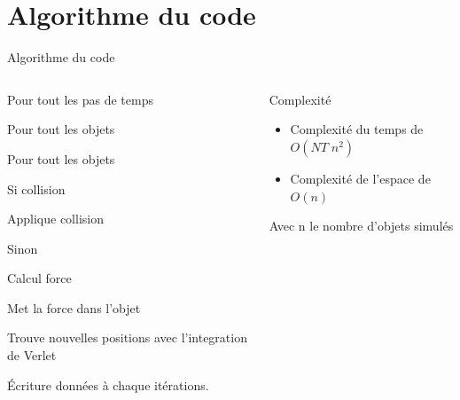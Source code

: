 \documentclass[aspectratio=169,xcolor=dvipsnames]{beamer}
\begin{document}
\section{Algorithme du code}
\begin{frame}{Algorithme du code}
    \begin{columns}
        \begin{column}[]{0.7\textwidth}
            \begin{itemize}
                \item[] Pour tout les pas de temps 
                {\setlength\itemindent{15pt} \item[] Pour tout les objets}
                {\setlength\itemindent{30pt} \item[] Pour tout les objets }
                {\setlength\itemindent{45pt} \item[] Si collision }
                {\setlength\itemindent{60pt} \item[] Applique collision}
                {\setlength\itemindent{45pt} \item[] Sinon}
                {\setlength\itemindent{60pt} \item[] Calcul force}
                {\setlength\itemindent{15pt} \item[] Met la force dans l'objet}
                \item[] Trouve nouvelles positions avec l'integration de Verlet 
                \item[] Écriture données à chaque itérations.
            \end{itemize}
        \end{column}
        \begin{column}[]{0.35\textwidth}
            \begin{block}{Complexité}
                \begin{itemize}
                    \item Complexité du temps de $O(NT\;n^2)$ 
                    \item Complexité de l'espace de $O(n)$
                \end{itemize}
                Avec n le nombre d'objets simulés
            \end{block}
        \end{column}
    \end{columns}
\end{frame}
\end{document}
